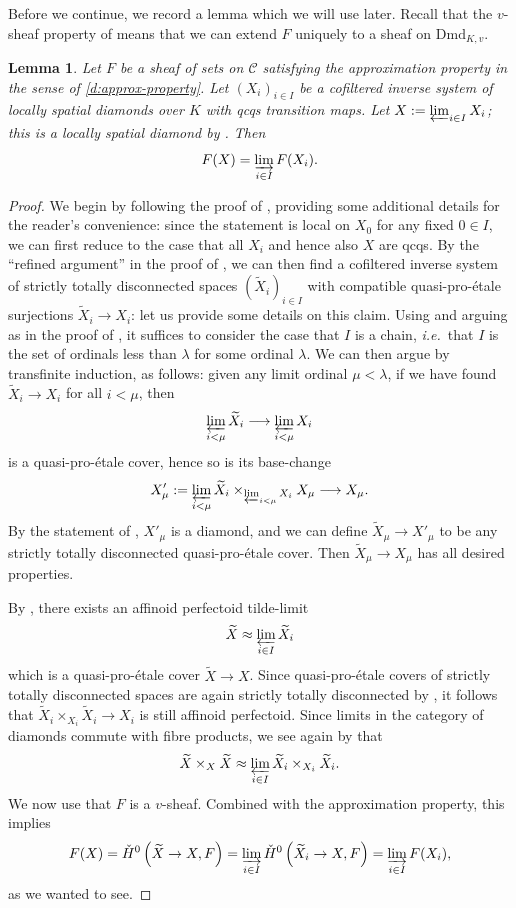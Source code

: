 \documentclass[11pt]{amsart}
\numberwithin{equation}{section}
\newtheorem{Lemma}[thm]{Lemma}
\theoremstyle{definition}
\theoremstyle{remark}
\newcommand{\lra}{\longrightarrow}
\newcommand{\wt}{\widetilde}
\newcommand{\cH}{{\ifmmode \check{H}\else{\v{C}ech}\fi}}
\newcommand{\Dmd}{\mathrm{Dmd}}
\begin{document}
Before we continue, we record a lemma which we will use later. Recall that the $v$-sheaf property of  means that we can extend $F$ uniquely to a sheaf on $\Dmd_{K,v}$.

\begin{Lemma}\label{l:approx-prop-for-fibre-products}
	Let $F$ be a sheaf of sets on $\mathcal C$ satisfying the approximation property in the sense of \cref{d:approx-property}. Let $(X_i)_{i\in I}$ be a cofiltered inverse system of locally spatial diamonds over $K$ with qcqs transition maps. Let $X:=\varprojlim_{i\in I} X_i$; this is a locally spatial diamond by \cite[Lemma~11.22]{etale-cohomology-of-diamonds}. Then
	\[ F(X)=\varinjlim_{i\in I} F(X_i).\]
\end{Lemma}

\begin{proof}
	We begin by following the proof of \cite[Lemma~11.22]{etale-cohomology-of-diamonds}, providing some additional details for the reader's convenience: since the statement is local on $X_0$ for any fixed $0\in I$, we can first reduce to the case that all $X_i$ and hence also $X$ are qcqs. By the ``refined argument'' in the proof of  \cite[Lemma~11.22]{etale-cohomology-of-diamonds}, we can then find a cofiltered inverse system of strictly totally disconnected spaces $(\wt X_i)_{i\in I}$ with compatible quasi-pro-\'etale surjections $\wt X_i\to X_i$: let us provide some details on this claim. Using \cite[Lemma~1.6]{Adamek-Rosicky} and arguing as in the proof of \cite[Corollary~1.7]{Adamek-Rosicky}, it suffices to consider the case that $I$ is a chain, \textit{i.e.}~that $I$ is the set of ordinals less than $\lambda$ for some ordinal $\lambda$. We can then argue by transfinite induction, as follows: given any limit ordinal $\mu<\lambda$, if we have found $\wt X_i\to X_i$ for all $i<\mu$, then 
	\[ \varprojlim_{i<\mu} \wt X_i\lra \varprojlim_{i<\mu} X_i\]
	is a quasi-pro-\'etale cover, hence so is its base-change
	\[ X'_\mu:=\varprojlim_{i<\mu} \wt X_i\times_{\varprojlim_{i<\mu} X_i}X_\mu \lra X_\mu.\]
	By the statement of \cite[Lemma~11.22]{etale-cohomology-of-diamonds}, $X'_\mu$ is a diamond, and we can define $\wt X_\mu\to X'_\mu$ to be any strictly totally disconnected quasi-pro-\'etale cover. Then $\wt X_\mu\to X_\mu$ has all desired properties.
	
	 By \cite[Proposition 6.5]{etale-cohomology-of-diamonds},  there exists an affinoid perfectoid tilde-limit
	\[ \wt X\approx \varprojlim_{i\in I} \wt X_i\]
	which is a quasi-pro-\'etale cover $\wt X\to X$. Since quasi-pro-\'etale covers of strictly totally disconnected spaces are again strictly totally disconnected by \cite[Lemma 7.19]{etale-cohomology-of-diamonds}, it follows that $\wt X_i\times_{X_i}\wt X_i\to X_i$ is still affinoid perfectoid. Since  limits in the category of diamonds commute with fibre products, we see  again by \cite[Proposition 6.5]{etale-cohomology-of-diamonds} that
	\[\wt X\times_X\wt X\approx \varprojlim_{i\in I} \wt X_i\times_{X_i}\wt X_i.\]
	We now use that $F$ is a $v$-sheaf. Combined with the approximation property, this implies
	\[ F(X)=\cH^0\left(\wt X\to X,F\right)=\varinjlim_{i\in I} \cH^0\left(\wt X_i\to X,F\right)=\varinjlim_{i\in I} F(X_i),\]
	as we wanted to see.
\end{proof}
\end{document}
